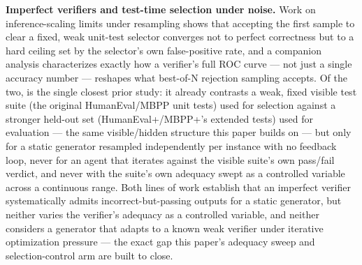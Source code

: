 \documentclass[11pt]{article}
\begin{document}
\textbf{Imperfect verifiers and test-time selection under noise.} Work on inference-scaling limits under resampling \citep{ResamplingLimits_j8H84v6AZ1} shows that accepting the first sample to clear a fixed, weak unit-test selector converges not to perfect correctness but to a hard ceiling set by the selector's own false-positive rate, and a companion analysis \citep{ROCnReroll_3Gy5mmyuxn} characterizes exactly how a verifier's full ROC curve --- not just a single accuracy number --- reshapes what best-of-N rejection sampling accepts. Of the two, \citet{ResamplingLimits_j8H84v6AZ1} is the single closest prior study: it already contrasts a weak, fixed visible test suite (the original HumanEval/MBPP unit tests) used for selection against a stronger held-out set (HumanEval+/MBPP+'s extended tests) used for evaluation --- the same visible/hidden structure this paper builds on --- but only for a static generator resampled independently per instance with no feedback loop, never for an agent that iterates against the visible suite's own pass/fail verdict, and never with the suite's own adequacy swept as a controlled variable across a continuous range. Both lines of work establish that an imperfect verifier systematically admits incorrect-but-passing outputs for a static generator, but neither varies the verifier's adequacy as a controlled variable, and neither considers a generator that adapts to a known weak verifier under iterative optimization pressure --- the exact gap this paper's adequacy sweep and selection-control arm are built to close.
\end{document}
